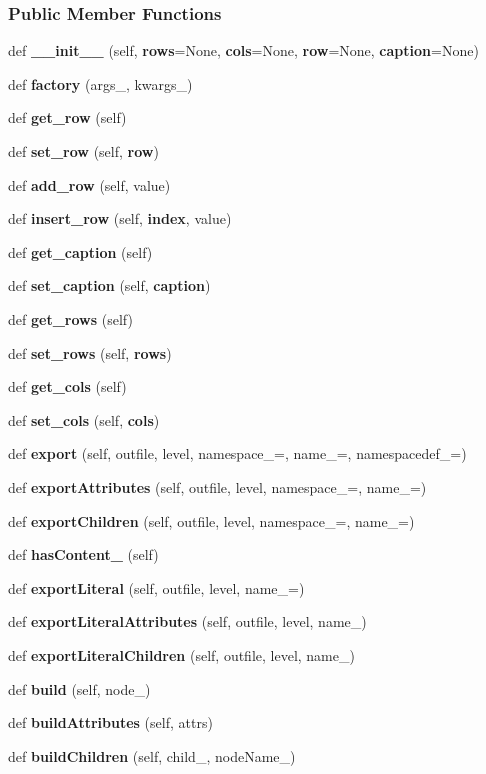 \subsubsection*{Public Member Functions}
\begin{DoxyCompactItemize}
\item 
def {\bf \+\_\+\+\_\+init\+\_\+\+\_\+} (self, {\bf rows}=None, {\bf cols}=None, {\bf row}=None, {\bf caption}=None)
\item 
def {\bf factory} (args\+\_\+, kwargs\+\_\+)
\item 
def {\bf get\+\_\+row} (self)
\item 
def {\bf set\+\_\+row} (self, {\bf row})
\item 
def {\bf add\+\_\+row} (self, value)
\item 
def {\bf insert\+\_\+row} (self, {\bf index}, value)
\item 
def {\bf get\+\_\+caption} (self)
\item 
def {\bf set\+\_\+caption} (self, {\bf caption})
\item 
def {\bf get\+\_\+rows} (self)
\item 
def {\bf set\+\_\+rows} (self, {\bf rows})
\item 
def {\bf get\+\_\+cols} (self)
\item 
def {\bf set\+\_\+cols} (self, {\bf cols})
\item 
def {\bf export} (self, outfile, level, namespace\+\_\+=\textquotesingle{}\textquotesingle{}, name\+\_\+=\textquotesingle{}, namespacedef\+\_\+=\textquotesingle{}\textquotesingle{})
\item 
def {\bf export\+Attributes} (self, outfile, level, namespace\+\_\+=\textquotesingle{}\textquotesingle{}, name\+\_\+=\textquotesingle{})
\item 
def {\bf export\+Children} (self, outfile, level, namespace\+\_\+=\textquotesingle{}\textquotesingle{}, name\+\_\+=\textquotesingle{})
\item 
def {\bf has\+Content\+\_\+} (self)
\item 
def {\bf export\+Literal} (self, outfile, level, name\+\_\+=\textquotesingle{})
\item 
def {\bf export\+Literal\+Attributes} (self, outfile, level, name\+\_\+)
\item 
def {\bf export\+Literal\+Children} (self, outfile, level, name\+\_\+)
\item 
def {\bf build} (self, node\+\_\+)
\item 
def {\bf build\+Attributes} (self, attrs)
\item 
def {\bf build\+Children} (self, child\+\_\+, node\+Name\+\_\+)
\end{DoxyCompactItemize}
